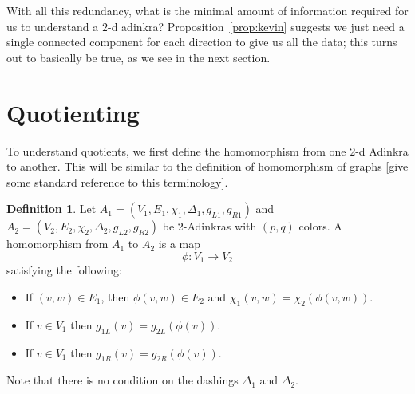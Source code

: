 \documentclass[12pt,twoside,singlespace]{article}
\numberwithin{equation}{section}
\newtheorem{lem}[equation]{Lemma}
\theoremstyle{definition}
\newtheorem{definition}[equation]{Definition}
\newcommand{\ZZ}{\mathbf{Z}}
\begin{document}
With all this redundancy, what is the minimal amount of information required for us to understand a $2$-d adinkra? Proposition~\ref{prop:kevin} suggests we just need a single connected component for each direction to give us all the data; this turns out to basically be true, as we see in the next section.

\begin{comment}
\begin{lem}
\label{lem:square}
In a $2$-d adinkra, suppose we have a path $(x, y \pm_1 1) \rightarrow (x, y) \rightarrow (x \pm_2 1, y)$, where each $\pm_i$ corresponds to a choice of sign, the first and the last vertices are connected to $(x \pm_2 1, y \pm_1 1)$ via the corresponding colors in a square.
\end{lem}
\begin{proof}
Because we have an ($1$-d) adinkra, the two edges in this path correspond to two different colors (WLOG $1$ and $2$ in order) respectively, and if we use the colors $2$ and $1$ in order we must also reach $(x \pm_2 1, y)$ from $(x, y \pm_1 1)$. Because left-moving colors only correspond to $y$-axis moves in the $\ZZ^2$ bigrading, and right-moving colors only correspond to $x$-axis moves, the first move must have displacement $(\pm_2 1, 0)$ and the second move must have displacement $(0, \pm_1)$. This is exactly equivalent to the statement.
\end{proof}
\end{comment}

\begin{comment}



We will worry less about exact rankings right now with the following construction: 

\end{comment}


\section{Quotienting}
To understand quotients, we first define the homomorphism from one $2$-d Adinkra to another.  This will be similar to the definition of homomorphism of graphs [give some standard reference to this terminology].

\begin{definition}
Let 
$A_1=(V_1,E_1,\chi_1,\Delta_1,g_{L1},g_{R1})$
and
$A_2=(V_2,E_2,\chi_2,\Delta_2,g_{L2},g_{R2})$
be 2-Adinkras with $(p,q)$ colors.  A homomorphism from $A_1$ to $A_2$ is a map
\[\phi:V_1\to V_2\]
satisfying the following:
\begin{itemize}
\item If $(v,w)\in E_1$, then $\phi(v,w)\in E_2$ and $\chi_1(v,w)=\chi_2(\phi(v,w))$.
\item If $v\in V_1$ then $g_{1L}(v)=g_{2L}(\phi(v))$.
\item If $v\in V_1$ then $g_{1R}(v)=g_{2R}(\phi(v))$.
\end{itemize}
Note that there is no condition on the dashings $\Delta_1$ and $\Delta_2$.
\end{definition}
\end{document}
